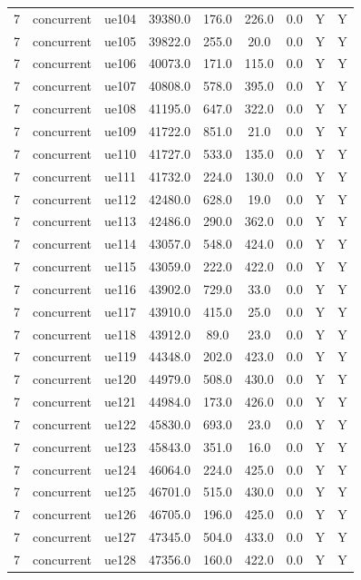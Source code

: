 \begin{table}[ht]
\begin{tabular}{|c|c|c|c|c|c|c|c|c|}
7 & concurrent & ue104 & 39380.0 & 176.0 & 226.0 & 0.0 & Y & Y \\
7 & concurrent & ue105 & 39822.0 & 255.0 & 20.0 & 0.0 & Y & Y \\
7 & concurrent & ue106 & 40073.0 & 171.0 & 115.0 & 0.0 & Y & Y \\
7 & concurrent & ue107 & 40808.0 & 578.0 & 395.0 & 0.0 & Y & Y \\
7 & concurrent & ue108 & 41195.0 & 647.0 & 322.0 & 0.0 & Y & Y \\
7 & concurrent & ue109 & 41722.0 & 851.0 & 21.0 & 0.0 & Y & Y \\
7 & concurrent & ue110 & 41727.0 & 533.0 & 135.0 & 0.0 & Y & Y \\
7 & concurrent & ue111 & 41732.0 & 224.0 & 130.0 & 0.0 & Y & Y \\
7 & concurrent & ue112 & 42480.0 & 628.0 & 19.0 & 0.0 & Y & Y \\
7 & concurrent & ue113 & 42486.0 & 290.0 & 362.0 & 0.0 & Y & Y \\
7 & concurrent & ue114 & 43057.0 & 548.0 & 424.0 & 0.0 & Y & Y \\
7 & concurrent & ue115 & 43059.0 & 222.0 & 422.0 & 0.0 & Y & Y \\
7 & concurrent & ue116 & 43902.0 & 729.0 & 33.0 & 0.0 & Y & Y \\
7 & concurrent & ue117 & 43910.0 & 415.0 & 25.0 & 0.0 & Y & Y \\
7 & concurrent & ue118 & 43912.0 & 89.0 & 23.0 & 0.0 & Y & Y \\
7 & concurrent & ue119 & 44348.0 & 202.0 & 423.0 & 0.0 & Y & Y \\
7 & concurrent & ue120 & 44979.0 & 508.0 & 430.0 & 0.0 & Y & Y \\
7 & concurrent & ue121 & 44984.0 & 173.0 & 426.0 & 0.0 & Y & Y \\
7 & concurrent & ue122 & 45830.0 & 693.0 & 23.0 & 0.0 & Y & Y \\
7 & concurrent & ue123 & 45843.0 & 351.0 & 16.0 & 0.0 & Y & Y \\
7 & concurrent & ue124 & 46064.0 & 224.0 & 425.0 & 0.0 & Y & Y \\
7 & concurrent & ue125 & 46701.0 & 515.0 & 430.0 & 0.0 & Y & Y \\
7 & concurrent & ue126 & 46705.0 & 196.0 & 425.0 & 0.0 & Y & Y \\
7 & concurrent & ue127 & 47345.0 & 504.0 & 433.0 & 0.0 & Y & Y \\
7 & concurrent & ue128 & 47356.0 & 160.0 & 422.0 & 0.0 & Y & Y \\

\end{tabular}
\end{table}
